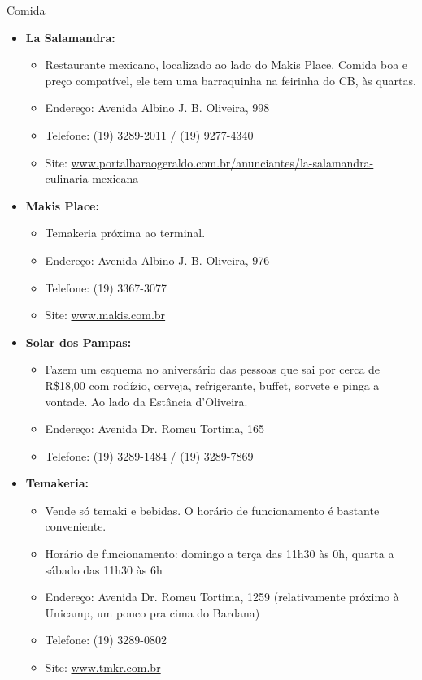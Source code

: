 \begin{story}{Comida}
\begin{itemize}
\item \textbf{La Salamandra:}
\begin{itemize}
\item Restaurante mexicano, localizado ao lado do Makis Place. Comida boa e preço compatível, ele tem uma barraquinha na feirinha do CB, às quartas.
\item Endereço: Avenida Albino J. B. Oliveira, 998
\item Telefone: (19) 3289-2011 / (19) 9277-4340
\item Site: \url{www.portalbaraogeraldo.com.br/anunciantes/la-salamandra-culinaria-mexicana-}
\end{itemize}

\item \textbf{Makis Place:}
\begin{itemize}
\item Temakeria próxima ao terminal.
\item Endereço: Avenida Albino J. B. Oliveira, 976
\item Telefone: (19) 3367-3077 
\item Site: \url{www.makis.com.br}
\end{itemize}

\item \textbf{Solar dos Pampas:}
\begin{itemize}
\item Fazem um esquema no aniversário das pessoas que sai por cerca de R\$18,00 com rodízio, cerveja, refrigerante, buffet, sorvete e pinga a vontade. Ao lado da Estância d'Oliveira.
\item Endereço: Avenida Dr. Romeu Tortima, 165
\item Telefone: (19) 3289-1484 / (19) 3289-7869
\end{itemize}

\item \textbf{Temakeria:}
\begin{itemize}
\item Vende só temaki e bebidas. O horário de funcionamento é bastante conveniente.
\item Horário de funcionamento: domingo a terça das 11h30 às 0h, quarta a sábado das 11h30 às 6h
\item Endereço: Avenida Dr. Romeu Tortima, 1259 (relativamente próximo à Unicamp, um pouco pra cima do Bardana)
\item Telefone: (19) 3289-0802
\item Site: \url{www.tmkr.com.br}
\end{itemize}


\end{itemize}
\end{story}
